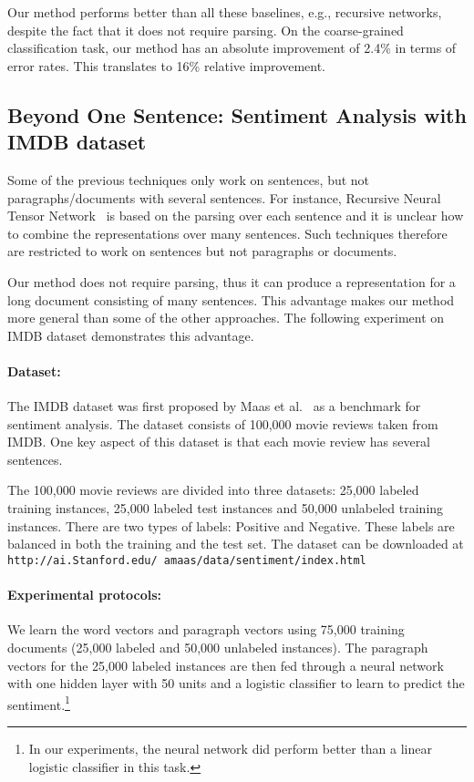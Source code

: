 \documentclass{article}
\begin{document}
Our method performs better than all these baselines, e.g., recursive
networks, despite the fact that it does not require parsing. On the
coarse-grained classification task, our method has an absolute
improvement of 2.4\% in terms of error rates. This translates to 16\%
relative improvement.

\subsection{Beyond One Sentence: Sentiment Analysis with IMDB dataset}
Some of the previous techniques only work on sentences, but not
paragraphs/documents with several sentences.  For instance, Recursive
Neural Tensor Network~\cite{socher13} is based on the parsing over
each sentence and it is unclear how to combine the representations
over many sentences. Such techniques therefore are restricted to work
on sentences but not paragraphs or documents.

Our method does not require parsing, thus it can produce a
representation for a long document consisting of many sentences. This
advantage makes our method more general than some of the other approaches. The
following experiment on IMDB dataset demonstrates this advantage.

\paragraph{Dataset:}
The IMDB dataset was first proposed by Maas et al.~\cite{maas11} as a
benchmark for sentiment analysis. The dataset consists of 100,000
movie reviews taken from IMDB. One key aspect of this dataset is that
each movie review has several sentences. 







The 100,000 movie reviews are divided into three datasets: 25,000
labeled training instances, 25,000 labeled test instances and 50,000
unlabeled training instances. There are two types of labels: Positive
and Negative. These labels are balanced in both the training and
the test set. The dataset can be downloaded at {\tt
  http://ai.Stanford.edu/\newline~amaas/data/sentiment/index.html}

\paragraph{Experimental protocols:}
We learn the word vectors and paragraph vectors using 75,000 training
documents (25,000 labeled and 50,000 unlabeled instances). The
paragraph vectors for the 25,000 labeled instances are then fed
through a neural network with one hidden layer with 50 units and a
logistic classifier to learn to predict the sentiment.\footnote{In our
  experiments, the neural network did perform better than a linear
  logistic classifier in this task.}
\end{document}
